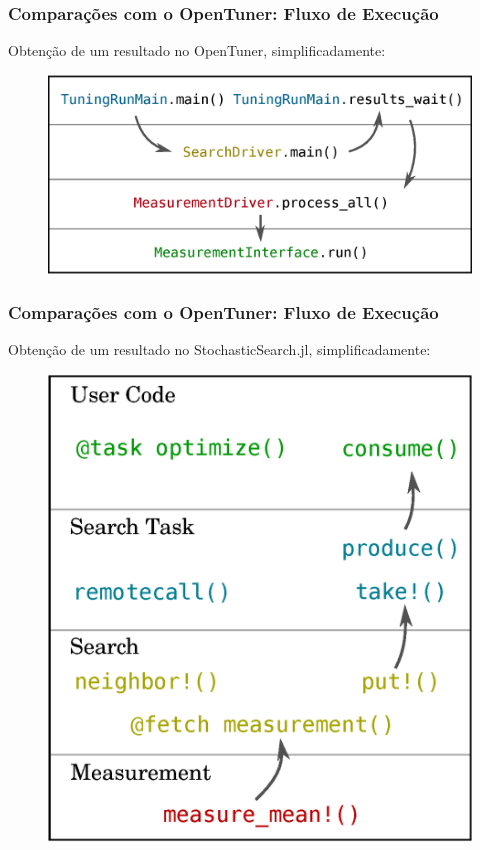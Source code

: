\documentclass[10pt, compress]{beamer}
\begin{document}
\begin{frame}[fragile]
    \frametitle{Comparações com o OpenTuner: Fluxo de Execução}
    Obtenção de um resultado no OpenTuner, simplificadamente:
    \begin{figure}[H]
        \centering
        \includegraphics[width=.9\textwidth]{opentunerflow_simple}
    \end{figure}%
\end{frame}

\begin{frame}[fragile]
    \frametitle{Comparações com o OpenTuner: Fluxo de Execução}
    Obtenção de um resultado no StochasticSearch.jl, simplificadamente:
    \begin{figure}[H]
        \centering
        \includegraphics[width=.55\textwidth]{stochasticsearchflow_simple}
    \end{figure}%
\end{frame}
\end{document}
